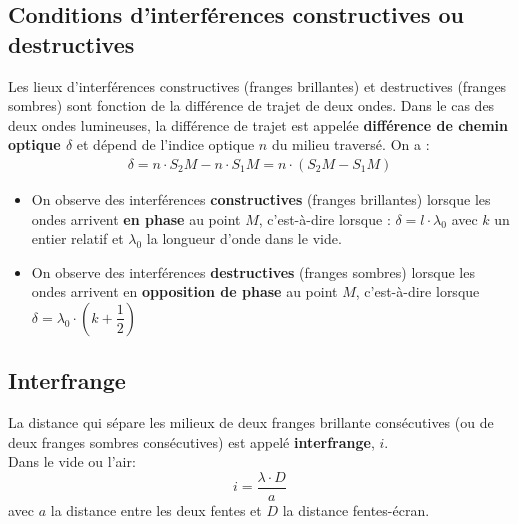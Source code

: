 \documentclass[a4paper,12pt,fleqn]{scrartcl}%
\begin{document}
	\subsection{Conditions d'interférences constructives ou destructives}
	Les lieux d'interférences constructives (franges brillantes) et destructives (franges sombres) sont fonction de la différence de trajet de deux ondes. Dans le cas des deux ondes lumineuses, la différence de trajet est appelée \textbf{différence de chemin optique $\delta$} et dépend de l'indice optique $n$ du milieu traversé. On a :
	\begin{eqnarray}
	\delta = n \cdot S_2M - n\cdot S_1M = n \cdot (S_2M - S_1M) \nonumber
	\end{eqnarray}
	\begin{itemize}
		\item On observe des interférences \textbf{constructives} (franges brillantes) lorsque les ondes arrivent \textbf{en phase} au point $M$, c'est-à-dire lorsque : $\delta = l \cdot \lambda_0$ avec $k$ un entier relatif et $\lambda_0$ la longueur d'onde dans le vide.
		\item On observe des interférences \textbf{destructives} (franges sombres) lorsque les ondes arrivent en \textbf{opposition de phase} au point $M$, c'est-à-dire lorsque $\delta = \lambda_0 \cdot \left(k + \dfrac{1}{2} \right)$
	\end{itemize}
	
	\subsection{Interfrange}
	La distance qui sépare les milieux de deux franges brillante consécutives (ou de deux franges sombres consécutives) est appelé \textbf{interfrange}, $i$.\\
	Dans le vide ou l'air: $$i = \dfrac{\lambda \cdot D}{a}$$
	avec $a$ la distance entre les deux fentes et $D$ la distance fentes-écran.
\end{document}
